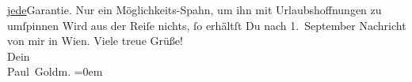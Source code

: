 \begin{ledgroupsized}[t]{13cm}
                  \uline{jede}{\pb}Garantie. Nur ein Möglichkeits-Spahn, um ihn mit
               Urlaubshoffnungen zu umſpinnen{\dotsfour}\pend
           \pstart
           Wird aus der Reiſe nichts, ſo erhältſt Du nach 1. September Nachricht von mir in Wien.\pend
           \pstart
           Viele treue Grüße! {\\[\baselineskip]}Dein {\\[\baselineskip]}\spacefill\mbox{Paul Goldm.}\pend
           \leftskip=0em{}\endnumbering{}\end{ledgroupsized}\begin{anhang}\end{anhang}\newcommand{\dateiname}{L02713}\newcommand{\titel}{Paul Goldmann an Arthur Schnitzler, 23. 8. [1893]}\newcommand{\editorInnen}{Martin Anton Müller und Laura Untner}
            \footnotesize
\begin{ledgroupsized}[t]{11.5cm}
\end{ledgroupsized}
         
      